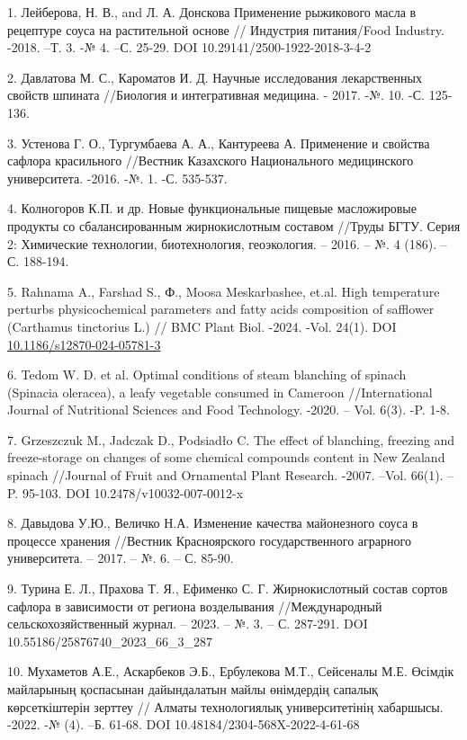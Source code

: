 \begin{references}
1. Лейберова, Н. В., and Л. А. Донскова Применение рыжикового масла в
рецептуре соуса на растительной основе // Индустрия питания/Food
Industry. -2018. --Т. 3. -№ 4. --С. 25-29. DOI
10.29141/2500-1922-2018-3-4-2

2. Давлатова М. С., Кароматов И. Д. Научные исследования лекарственных
свойств шпината //Биология и интегративная медицина. - 2017. -№. 10.
-С. 125-136.

3. Устенова Г. О., Тургумбаева А. А., Кантуреева А. Применение и свойства
сафлора красильного //Вестник Казахского Национального медицинского
университета. -2016. -№. 1. -С. 535-537.

4. Колногоров К.П. и др. Новые функциональные пищевые масложировые
продукты со сбалансированным жирнокислотным составом //Труды БГТУ.
Серия 2: Химические технологии, биотехнология, геоэкология. -- 2016.
-- №. 4 (186). -- С. 188-194.

5. Rahnama A., Farshad S., Ф., Moosa Meskarbashee, et.al. High
temperature perturbs physicochemical parameters and fatty acids
composition of safflower (Carthamus tinctorius L.) // BMC Plant Biol.
-2024. -Vol. 24(1). DOI
\href{https://doi.org/10.1186/s12870-024-05781-3}{10.1186/s12870-024-05781-3}

6. Tedom W. D. et al. Optimal conditions of steam blanching of spinach
(Spinacia oleracea), a leafy vegetable consumed in Cameroon
//International Journal of Nutritional Sciences and Food Technology.
-2020. -- Vol. 6(3). -P. 1-8.

7. Grzeszczuk M., Jadczak D., Podsiadło C. The effect of blanching,
freezing and freeze-storage on changes of some chemical compounds
content in New Zealand spinach //Journal of Fruit and Ornamental Plant
Research. -2007. --Vol. 66(1). -- P. 95-103. DOI
10.2478/v10032-007-0012-x

8. Давыдова У.Ю., Величко Н.А. Изменение качества майонезного соуса в
процессе хранения //Вестник Красноярского государственного аграрного
университета. -- 2017. -- №. 6. -- С. 85-90.

9. Турина Е. Л., Прахова Т. Я., Ефименко С. Г. Жирнокислотный состав
сортов сафлора в зависимости от региона возделывания //Международный
сельскохозяйственный журнал. -- 2023. -- №. 3. -- С. 287-291. DOI
10.55186/25876740\_2023\_66\_3\_287

10. Мухаметов А.Е., Аскарбеков Э.Б., Ербулекова М.Т., Сейсеналы М.Е.
Өсімдік майларының қоспасынан дайындалатын майлы өнімдердің сапалық
көрсеткіштерін зерттеу // Алматы технологиялық университетінің
хабаршысы. -2022. -№ (4). --Б. 61-68. DOI
10.48184/2304-568X-2022-4-61-68
\end{references}

